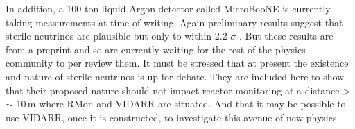In addition, a 100 ton liquid Argon detector called MicroBooNE \cite{Karagiorgi_2012} is currently taking measurements at time of writing. Again preliminary results suggest that sterile neutrinos are plausible but only to within 2.2 $\sigma$ \cite{denton2021sterile}. But these results are from a preprint and so are currently waiting for the rest of the physics community to per review them. It must be stressed that at present the existence and nature of sterile neutrinos is up for debate. They are included here to show that their proposed nature should not impact reactor monitoring at a distance > $\sim$ 10\,m  where RMon and VIDARR are situated. And that it may be possible to use VIDARR, once it is constructed, to investigate this avenue of new physics.



